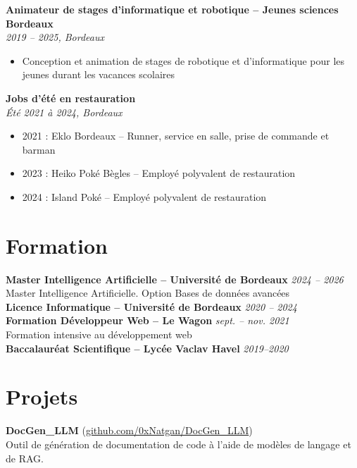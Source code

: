 \documentclass[a4paper,10pt]{article}
\begin{document}
\noindent\textbf{Animateur de stages d'informatique et robotique -- Jeunes sciences Bordeaux}\\ \hfill \textit{2019 -- 2025, Bordeaux}
\begin{itemize}
    \item Conception et animation de stages de robotique et d'informatique pour les jeunes durant les vacances scolaires
\end{itemize}

\noindent\textbf{Jobs d'été en restauration}\\ \hfill \textit{Été 2021 à 2024, Bordeaux}
\begin{itemize}
    \item 2021 : Eklo Bordeaux -- Runner, service en salle, prise de commande et barman
    \item 2023 : Heiko Poké Bègles -- Employé polyvalent de restauration
    \item 2024 : Island Poké -- Employé polyvalent de restauration
\end{itemize}

\section*{Formation}
\noindent\textbf{Master Intelligence Artificielle -- Université de Bordeaux} \hfill \textit{2024 -- 2026}\\
\indent Master Intelligence Artificielle. Option Bases de données avancées\\

\noindent\textbf{Licence Informatique -- Université de Bordeaux} \hfill \textit{2020 -- 2024}\\

\noindent\textbf{Formation Développeur Web -- Le Wagon} \hfill \textit{sept. -- nov. 2021}\\
\indent Formation intensive au développement web\\

\noindent\textbf{Baccalauréat Scientifique -- Lycée Vaclav Havel} \hfill \textit{2019--2020}\\


\section*{Projets}
\noindent\textbf{DocGen\_LLM} (\href{https://github.com/0xNatgan/DocGen_LLM}{github.com/0xNatgan/DocGen\_LLM})\\
Outil de génération de documentation de code à l'aide de modèles de langage et de RAG.\\
\end{document}
